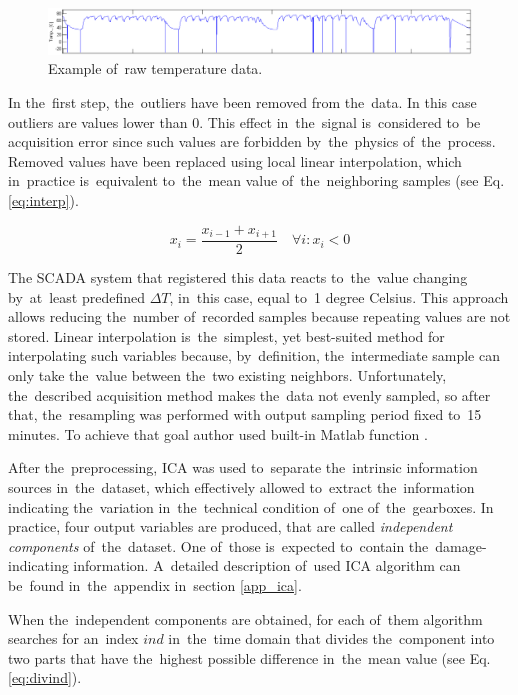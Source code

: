 \begin{figure}[ht!]
\centering
\includegraphics[width = \textwidth]{wykresy/ex_temp.PNG}
\caption{Example of~raw temperature data.}
\label{fig: ex_temp}
\end{figure}

In the~first step, the~outliers have been removed from the~data. In this case outliers are values lower than $0$. This effect in~the~signal is~considered to~be acquisition error since such values are forbidden by~the~physics of~the~process. Removed values have been replaced using local linear interpolation, which in~practice is~equivalent to~the~mean value of~the~neighboring samples (see Eq. \ref{eq:interp}).

\begin{equation}\label{eq:interp}
  x_{i}=\frac{x_{i-1}+x_{i+1}}{2} \quad \forall i: x_i<0
\end{equation}

The SCADA system that registered this data reacts to~the~value changing by~at~least predefined $\Delta T$, in~this case, equal to~1 degree Celsius. This approach allows reducing the~number of~recorded samples because repeating values are not stored. Linear interpolation is~the~simplest, yet best-suited method for interpolating such variables because, by~definition, the~intermediate sample can only take the~value between the~two existing neighbors. Unfortunately, the~described acquisition method makes the~data not evenly sampled, so after that, the~resampling was performed with output sampling period fixed to~15 minutes. To achieve that goal author used built-in Matlab function . 

After the~preprocessing, ICA was used to~separate the~intrinsic information sources in~the~dataset, which effectively allowed to~extract the~information indicating the~variation in~the~technical condition of~one of~the~gearboxes. In practice, four output variables are produced, that are called \emph{independent components} of~the~dataset. One of~those is~expected to~contain the~damage-indicating information. A~detailed description of~used ICA algorithm can be~found in~the~appendix in~section \ref{app_ica}.

When the~independent components are obtained, for each of~them algorithm searches for an~index $ind$ in~the~time domain that divides the~component into two parts that have the~highest possible difference in~the~mean value (see Eq. \ref{eq:divind}). 

